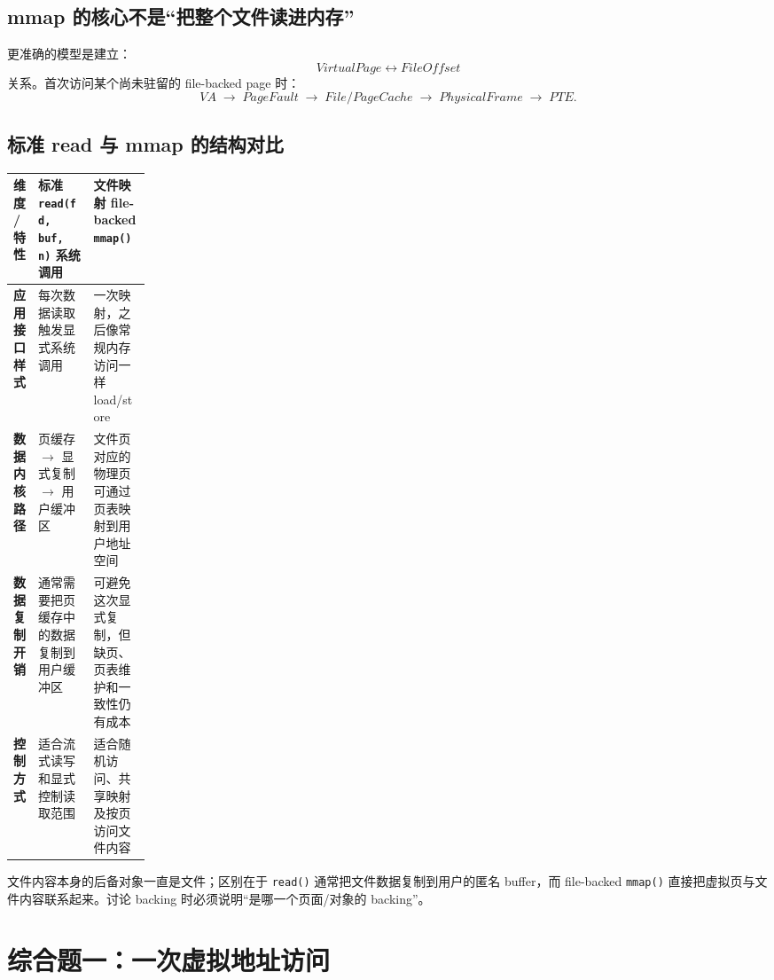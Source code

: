 \documentclass[11pt,a4paper]{ctexart}
\newcommand{\code}[1]{\texttt{#1}}
\newcommand{\arr}{\;\longrightarrow\;}
\begin{document}
\subsection{mmap 的核心不是“把整个文件读进内存”}
更准确的模型是建立：
\[
\boxed{VirtualPage \leftrightarrow FileOffset}
\]
关系。首次访问某个尚未驻留的 file-backed page 时：
\[
VA\arr PageFault\arr File/PageCache\arr PhysicalFrame\arr PTE.
\]

\subsection{标准 read 与 mmap 的结构对比}
\begingroup
\small
\renewcommand{\arraystretch}{1.25}
\setlength{\tabcolsep}{6pt}
\begin{tabularx}{\linewidth}{>{\bfseries}p{0.18\linewidth} X X}
\toprule
维度 / 特性 & 标准 \code{read(fd, buf, n)} 系统调用 & 文件映射 file-backed \code{mmap()}\\
\midrule
应用接口样式 & 每次数据读取触发显式系统调用 & 一次映射，之后像常规内存访问一样 load/store\\
数据内核路径 & 页缓存 $\rightarrow$ 显式复制 $\rightarrow$ 用户缓冲区 & 文件页对应的物理页可通过页表映射到用户地址空间\\
数据复制开销 & 通常需要把页缓存中的数据复制到用户缓冲区 & 可避免这次显式复制，但缺页、页表维护和一致性仍有成本\\
控制方式 & 适合流式读写和显式控制读取范围 & 适合随机访问、共享映射及按页访问文件内容\\
\bottomrule
\end{tabularx}
\endgroup

\begin{warn}
文件内容本身的后备对象一直是文件；区别在于 \code{read()} 通常把文件数据复制到用户的匿名 buffer，而 file-backed \code{mmap()} 直接把虚拟页与文件内容联系起来。讨论 backing 时必须说明“是哪一个页面/对象的 backing”。
\end{warn}

\section{综合题一：一次虚拟地址访问}
\end{document}
